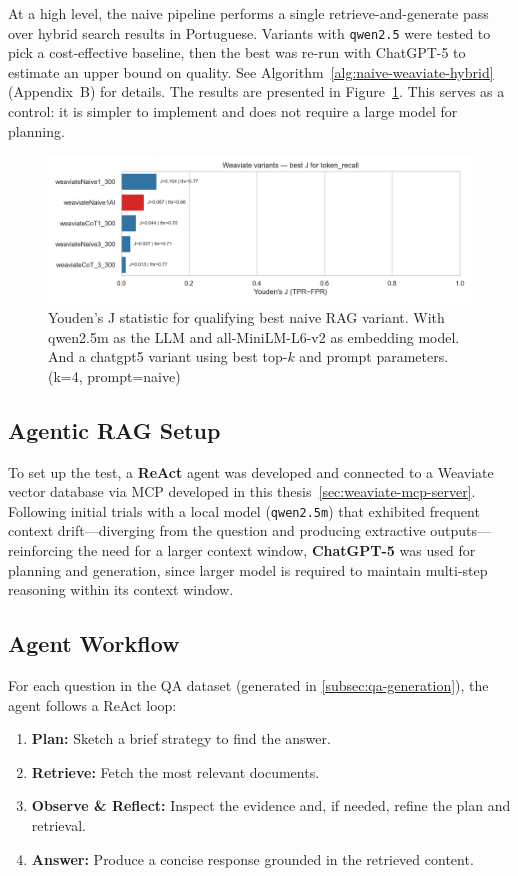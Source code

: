 At a high level, the naive pipeline performs a single retrieve-and-generate pass over hybrid search results in Portuguese. Variants with \texttt{qwen2.5} were tested to pick a cost-effective baseline, then the best was re-run with ChatGPT-5 to estimate an upper bound on quality. See Algorithm~\ref{alg:naive-weaviate-hybrid} (Appendix~B) for details.
The results are presented in Figure~\ref{fig:weaviate_test}.
This serves as a control: it is simpler to implement and does not require a large model for planning.
\begin{figure}
    \centering
    \includegraphics[width=1\linewidth]{Figures/10_weaviate_best_j_token_recall.png}
    \caption{Youden's J statistic for qualifying best naive \gls{RAG} variant. With qwen2.5m as the \gls{LLM} and all-MiniLM-L6-v2 as embedding model. And a chatgpt5 variant using best top-$k$ and prompt parameters.(k=4, prompt=naive)}
    \label{fig:weaviate_test}
\end{figure}
\subsection{Agentic RAG Setup}
\label{sec:agentic-test}

To set up the test, a \textbf{ReAct} agent was developed and connected to a Weaviate vector database via \gls{MCP} developed in this thesis~\ref{sec:weaviate-mcp-server}. Following initial trials with a local model (\texttt{qwen2.5m}) that exhibited frequent context drift—diverging from the question and producing extractive outputs—reinforcing the need for a larger context window, \textbf{ChatGPT-5} was used for planning and generation, since larger model is required to maintain multi-step reasoning within its context window.

\subsection{Agent Workflow}
For each question in the \gls{QA} dataset (generated in \ref{subsec:qa-generation}), the agent follows a ReAct loop:
\begin{enumerate}
\item \textbf{Plan:} Sketch a brief strategy to find the answer.
\item \textbf{Retrieve:} Fetch the most relevant documents.
\item \textbf{Observe \& Reflect:} Inspect the evidence and, if needed, refine the plan and retrieval.
\item \textbf{Answer:} Produce a concise response grounded in the retrieved content.
\end{enumerate}

